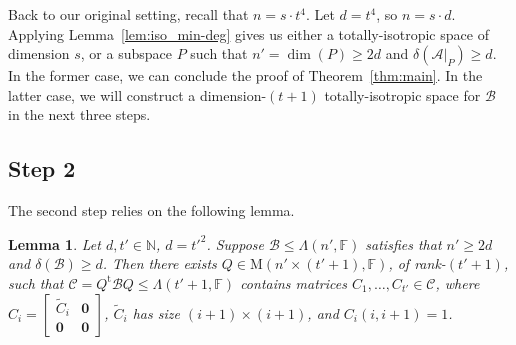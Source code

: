 \documentclass[10pt]{article}
\newtheorem{lemma}[theorem]{Lemma}
\newcommand{\tuple}[1]{\mathbf{#1}}
\newcommand{\spa}[1]{\mathcal{#1}}
\newcommand{\F}{\mathbb{F}}
\newcommand{\N}{\mathbb{N}}
\newcommand{\M}{\mathrm{M}}
\newcommand{\cA}{\spa{A}}
\newcommand{\cB}{\spa{B}}
\newcommand{\cC}{\spa{C}}
\newcommand{\vzero}{\tuple{0}}
\newcommand{\tr}[1]{#1^{\mathrm{t}}}
\begin{document}
Back to our original setting, recall that $n=s\cdot t^4$. Let $d=t^4$, so 
$n=s\cdot d$. Applying Lemma~\ref{lem:iso_min-deg} gives us 
either 
a totally-isotropic 
space of 
dimension $s$, or a subspace $P$ such that $n'=\dim(P)\geq 2d$ and 
$\delta(\cA|_P)\geq d$. In the former case, we can conclude the proof of 
Theorem~\ref{thm:main}. 
In the latter case, we will construct a 
dimension-$(t+1)$ totally-isotropic space for $\cB$ in the next three steps. 


%
%
%
%
%



\subsection{Step 2}  The second step relies on the following lemma.

\begin{lemma}\label{lem:step2}
Let $d, t'\in \N$, $d=t'^2$. Suppose $\cB\leq\Lambda(n', \F)$ satisfies that 
$n'\geq 2d$ and $\delta(\cB)\geq d$. Then there exists $Q\in \M(n'\times (t'+1), 
\F)$, of rank-$(t'+1)$, such that $\cC=\tr{Q}\cB 
Q\leq 
\Lambda(t'+1, \F)$ contains matrices $C_1, \dots, C_{t'}\in \cC$, where
$C_i=\begin{bmatrix}
\tilde C_i & \vzero \\
\vzero & \vzero 
\end{bmatrix}$, $\tilde C_i$ has size $(i+1)\times (i+1)$, and $C_i(i, 
i+1)=1$.
\end{lemma}
\end{document}
